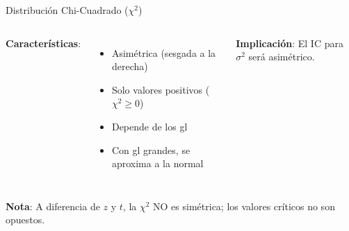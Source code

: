 \documentclass[aspectratio=169, 11pt]{beamer}
\begin{document}
\begin{frame}{Distribución Chi-Cuadrado ($\chi^2$)}
\begin{columns}[T]
\textbf{Características}:
\begin{itemize}
  \item \alert{Asimétrica} (sesgada a la derecha)
  \item Solo valores positivos ($\chi^2 \geq 0$)
  \item Depende de los gl
  \item Con gl grandes, se aproxima a la normal
\end{itemize}

\vspace{0.3cm}
\textbf{Implicación}: El IC para $\sigma^2$ será \alert{asimétrico}.

\end{columns}

\vspace{0.3cm}
\small
\textbf{Nota}: A diferencia de $z$ y $t$, la $\chi^2$ NO es simétrica; los valores críticos no son opuestos.
\end{frame}
\end{document}

